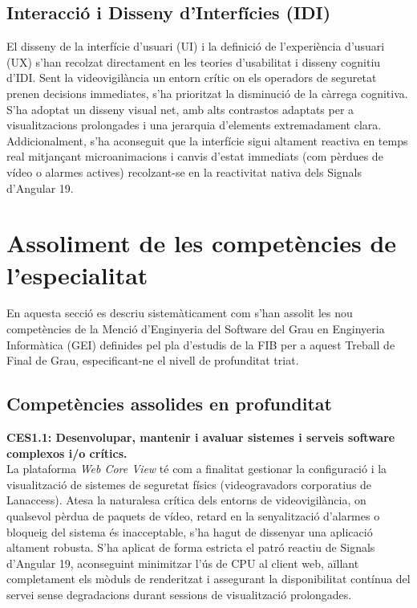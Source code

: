 \subsection{Interacció i Disseny d'Interfícies (IDI)}
El disseny de la interfície d'usuari (UI) i la definició de l'experiència d'usuari (UX) s'han recolzat directament en les teories d'usabilitat i disseny cognitiu d'IDI. Sent la videovigilància un entorn crític on els operadors de seguretat prenen decisions immediates, s'ha prioritzat la disminució de la càrrega cognitiva. S'ha adoptat un disseny visual net, amb alts contrastos adaptats per a visualitzacions prolongades i una jerarquia d'elements extremadament clara. Addicionalment, s'ha aconseguit que la interfície sigui altament reactiva en temps real mitjançant microanimacions i canvis d'estat immediats (com pèrdues de vídeo o alarmes actives) recolzant-se en la reactivitat nativa dels Signals d'Angular 19.

\section{Assoliment de les competències de l'especialitat}
En aquesta secció es descriu sistemàticament com s'han assolit les nou competències de la Menció d'Enginyeria del Software del Grau en Enginyeria Informàtica (GEI) definides pel pla d'estudis de la FIB per a aquest Treball de Final de Grau, especificant-ne el nivell de profunditat triat.

\subsection{Competències assolides en profunditat}

\noindent \textbf{CES1.1: Desenvolupar, mantenir i avaluar sistemes i serveis software complexos i/o crítics.}\\
La plataforma \textit{Web Core View} té com a finalitat gestionar la configuració i la visualització de sistemes de seguretat físics (videogravadors corporatius de Lanaccess). Atesa la naturalesa crítica dels entorns de videovigilància, on qualsevol pèrdua de paquets de vídeo, retard en la senyalització d'alarmes o bloqueig del sistema és inacceptable, s'ha hagut de dissenyar una aplicació altament robusta. S'ha aplicat de forma estricta el patró reactiu de Signals d'Angular 19, aconseguint minimitzar l'ús de CPU al client web, aïllant completament els mòduls de renderitzat i assegurant la disponibilitat contínua del servei sense degradacions durant sessions de visualització prolongades.


